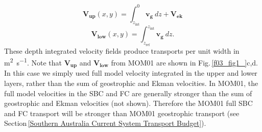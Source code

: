 \documentclass[preprint,3p,review,12pt]{elsarticle}
\renewcommand{\Vec}[1]{\mathbf{#1}}
\newcommand{\sub}[1]{_{\text{#1}}}
\begin{document}
\begin{equation} \label{eq:1}
\Vec{V\sub{up}}(x,y) = \int_{z\sub{int}}^{0}\Vec{v\sub{g}}\ dz + \Vec{V\sub{ek}}
\end{equation}
%
\begin{equation} \label{eq:2}
\Vec{V\sub{low}}(x,y) = \int_{z\sub{ref}}^{z\sub{int}}\Vec{v\sub{g}}\ dz.
\end{equation}
%
These depth integrated velocity fields produce transports per unit width in \si{\square\meter\per\second}. Note that $\Vec{V\sub{up}}$ and $\Vec{V\sub{low}}$ from MOM01 are shown in Fig.\,\ref{f03_fig1_}c,d. In this case we simply used full model velocity integrated in the upper and lower layers, rather than the sum of geostrophic and Ekman velocities. In MOM01, the full model velocities in the SBC and FC are generally stronger than the sum of geostrophic and Ekman velocities (not shown). Therefore the MOM01 full SBC and FC transport will be stronger than MOM01 geostrophic transport (see Section\,\ref{Southern Australia Current System Transport Budget}).
%
\end{document}
